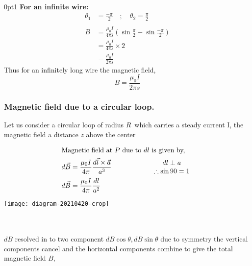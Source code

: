 \hspace{5.10cm}
\opencutright
\renewcommand\windowpagestuff{
	\centering\texttt{[image: 12-crop]}}
\begin{note}
	\vspace{0.5cm}
	\begin{cutout}{3}{\dimexpr\linewidth-7cm\relax}{0pt}{1}
		{\textbf{ For an infinite wire:}}
	\begin{align*}
	\theta_{1}&=\frac{-\pi}{2}\quad ; \quad
	\theta_{2}=\frac{\pi}{2}\\\\
	B&=\frac{\mu_{0} I}{4 \pi s}\left(\sin \frac{\pi}{2}-\sin \frac{-\pi}{2}\right)\\
	&=\frac{\mu_{0} I}{4 \pi s}\times2
  \\&=\frac{\mu_{0} I}{2 \pi s}
	\end{align*}
	Thus for an infinitely long wire the magnetic field, 
	\begin{equation*}
	B=\frac{\mu_{0} I}{2 \pi s}
	\end{equation*}
	\end{cutout}
\end{note}
\subsubsection{Magnetic field due to a circular loop.}
 Let us consider a circular loop of radius $ R  $\ which carries a steady current I, the magnetic field a distance $ z $ above the center

\begin{minipage}{0.55\textwidth}
\begin{align*}
	\intertext{Magnetic field at $P$ due to $dl$ is given by,}
	d \vec{B}&=\frac{\mu_{0}I}{4 \pi} \frac{ d \vec{l} \times \vec{a}}{a^{3}}\hspace{2cm} \begin{array}{cc}
	dl\perp a\\
	\therefore\sin90=1
	\end{array}\\
	d \vec{B}&=\frac{\mu_{0}I}{4 \pi} \frac{ d {l} }{a^{2}}
	\end{align*}
\end{minipage}
\begin{minipage}{0.35\textwidth}
	\centering
	\texttt{[image: diagram-20210420-crop]}
\end{minipage}\\\\
$dB$ resolved in to two component $dB \cos \theta, dB \sin \theta $ due to symmetry the vertical components cancel and the horizontal components combine to give the total magnetic field $B$,
	


